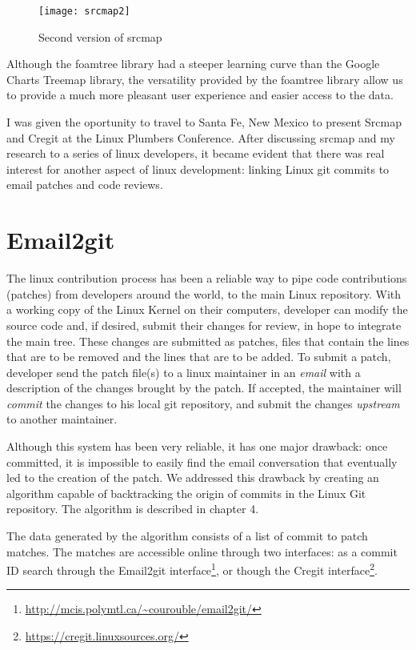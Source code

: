 \begin{figure}[htb]
\centering
\texttt{[image: srcmap2]}
\caption{Second version of srcmap}
\label{fig:srcmap2}
\end{figure}

Although the foamtree library had a steeper learning curve than the Google Charts Treemap library, the versatility provided by the foamtree library allow us to provide a much more pleasant user experience and easier access to the data.

I was given the oportunity to travel to Santa Fe, New Mexico to present Srcmap and Cregit at the Linux Plumbers Conference. After discussing srcmap and my research to a series of linux developers, it became evident that there was real interest for another aspect of linux development: linking Linux git commits to email patches and code reviews.


\section{Email2git}

The linux contribution process has been a reliable way to pipe code contributions (patches) from developers around the world, to the main Linux repository. With a working copy of the Linux Kernel on their computers, developer can modify the source code and, if desired, submit their changes for review, in hope to integrate the main tree. These changes are submitted as patches, files that contain the lines that are to be removed and the lines that are to be added. To submit a patch, developer send the patch file(s) to a linux maintainer in an \textit{email} with a description of the changes brought by the patch. If accepted, the maintainer will \textit{commit} the changes to his local git repository, and submit the changes \textit{upstream} to another maintainer. 

Although this system has been very reliable, it has one major drawback: once committed, it is impossible to easily find the email conversation that eventually led to the creation of the patch. We addressed this drawback by creating an algorithm capable of backtracking the origin of commits in the Linux Git repository. The algorithm is described in chapter 4.

The data generated by the algorithm consists of a list of commit to patch matches. The matches are accessible online through two interfaces: as a commit ID search through the Email2git interface\footnote{\url{http://mcis.polymtl.ca/~courouble/email2git/}}, or though the Cregit interface\footnote{\url{https://cregit.linuxsources.org/}}.

